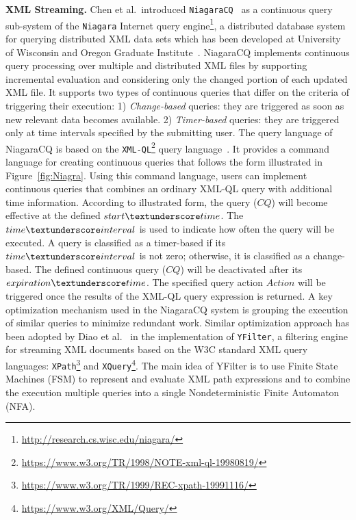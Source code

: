 \textbf{XML Streaming.}
Chen et al.\ introduced  \texttt{NiagaraCQ}~\cite{chen_et_al_2000} as a continuous query sub-system of the \texttt{Niagara}
Internet query engine\footnote{\url{http://research.cs.wisc.edu/niagara/}},  a distributed database system for querying distributed XML data sets which has been developed at University of Wisconsin and Oregon Graduate Institute~\cite{naughton2001niagara}. NiagaraCQ implements continuous query processing over multiple and distributed XML files by supporting incremental evaluation and considering only the changed portion of each updated XML file. It supports two types of continuous queries that differ on the criteria of triggering their execution:
1) \emph{Change-based}  queries: they are triggered as soon as new relevant data becomes available. 2) \emph{Timer-based}  queries: they are triggered only at time intervals specified by the submitting user. The query language of NiagaraCQ is based on the \texttt{XML-QL}\footnote{\url{https://www.w3.org/TR/1998/NOTE-xml-ql-19980819/}} query language~\cite{deutsch1999query}.
It provides a command language for creating continuous queries that follows the  form illustrated in Figure~\ref{fig:Niagra}. Using this command language, users can implement continuous queries that combines an ordinary XML-QL query with additional time information.
According to illustrated form, the query ($CQ$) will become effective at the defined $start\textunderscore time$. The
$time\textunderscore interval$ is used to indicate how often the query will be executed. A
query is classified as a timer-based if its $time\textunderscore interval$ is not zero; otherwise, it
is classified as a change-based.
The defined continuous query ($CQ$) will be deactivated after its $expiration\textunderscore time$. The specified query action $Action$ will be triggered once the results of the XML-QL query expression is returned.  A key optimization mechanism used  in the NiagaraCQ system is grouping the execution of similar queries to minimize redundant work.  Similar optimization approach has been adopted by Diao et al.~\cite{diao_et_al_2002} in the implementation of  \texttt{YFilter}, a filtering engine for streaming XML documents based on the W3C standard XML query languages: \texttt{XPath}\footnote{\url{https://www.w3.org/TR/1999/REC-xpath-19991116/}} and \texttt{XQuery}\footnote{\url{https://www.w3.org/XML/Query/}}. The main idea of YFilter is to use Finite State Machines (FSM)  to represent and evaluate XML path expressions and to combine the execution multiple queries into a single Nondeterministic Finite Automaton (NFA).
